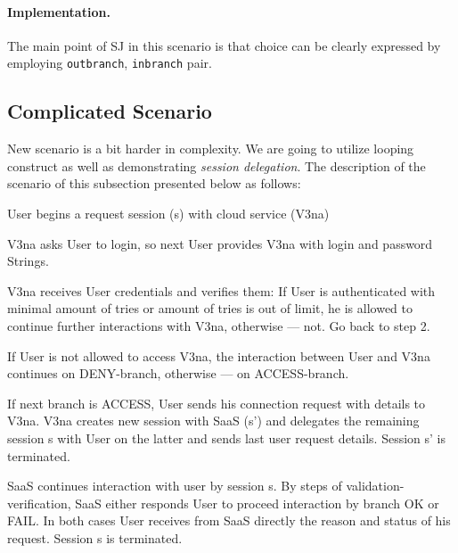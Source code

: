 \documentclass{llncs}
\begin{document}
\paragraph{Implementation.} The main point of SJ in this scenario is that choice can be clearly expressed by employing \texttt{outbranch}, \texttt{inbranch} pair.

\subsection{Complicated Scenario}
New scenario is a bit harder in complexity. We are going to utilize looping construct as well as demonstrating \textit{session delegation}. The description of the scenario of this subsection presented below as follows:
\begin{compactenum}
\item  User begins a request session (s) with cloud service (V3na)

\item  V3na asks User to login, so next User provides V3na with login and password Strings.

\item  V3na receives User credentials and verifies them: If User is authenticated with minimal amount of tries or amount of tries is out of limit, he is allowed to continue further interactions with V3na, otherwise --- not. Go back to step 2.

\item  If User is not allowed to access V3na, the interaction between User and V3na continues on DENY-branch, otherwise --- on ACCESS-branch.

\item  If next branch is ACCESS, User sends his connection request with details to V3na. V3na creates new session with SaaS (s') and delegates the remaining session s with User on the latter and sends last user request details. Session s' is terminated.

\item  SaaS continues interaction with user by session s. By steps of validation-verification, SaaS either responds User to proceed interaction by branch OK or FAIL. In both cases User receives from SaaS directly the reason and status of his request. Session s is terminated.
\end{compactenum}
\end{document}
